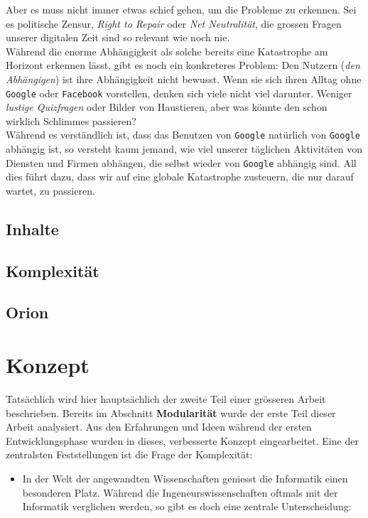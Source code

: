 \documentclass[11pt]{report}
\begin{document}
\noindent Aber es muss nicht immer etwas schief gehen, um die Probleme
zu erkennen. Sei es politische Zensur, \emph{Right to Repair} oder \emph{Net
Neutralität}, die grossen Fragen unserer digitalen Zeit sind so
relevant wie noch nie.\\

\noindent Während die enorme Abhängigkeit als solche bereits eine
Katastrophe am Horizont erkennen lässt, gibt es noch ein konkreteres
Problem: Den Nutzern (\emph{den Abhängigen}) ist ihre Abhängigkeit nicht
bewusst. Wenn sie sich ihren Alltag ohne \texttt{Google} oder \texttt{Facebook}
vorstellen, denken sich viele nicht viel darunter. Weniger \emph{lustige
Quizfragen} oder Bilder von Haustieren, aber was könnte den schon
wirklich Schlimmes passieren?\\

\noindent Während es verständlich ist, dass das Benutzen von \texttt{Google}
natürlich von \texttt{Google} abhängig ist, so versteht kaum jemand, wie viel
unserer täglichen Aktivitäten von Diensten und Firmen abhängen, die
selbst wieder von \texttt{Google} abhängig sind. All dies führt dazu, dass wir
auf eine globale Katastrophe zusteuern, die nur darauf wartet, zu
passieren.
\chapter{Inhalte}
\label{sec:org6394ccc}
\chapter{Komplexität}
\label{sec:org585ace9}
\chapter{Orion}
\label{sec:org9151ed0}
\part{Konzept}
\label{sec:org344ada1}
Tatsächlich wird hier hauptsächlich der zweite Teil einer grösseren
Arbeit beschrieben. Bereits im Abschnitt \textbf{Modularität} wurde der erste
Teil dieser Arbeit analysiert. Aus den Erfahrungen und Ideen während
der ersten Entwicklungsphase wurden in dieses, verbesserte Konzept
eingearbeitet. Eine der zentralsten Feststellungen ist die Frage der
Komplexität:
\begin{itemize}
\item In der Welt der angewandten Wissenschaften geniesst die Informatik
einen besonderen Platz. Während die Ingeneurswissenschaften oftmals
mit der Informatik verglichen werden, so gibt es doch eine zentrale
Unterscheidung:
\end{itemize}
\end{document}
